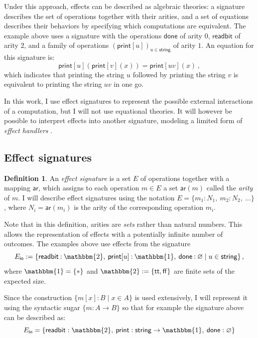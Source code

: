 \documentclass[11pt,oneside]{book}
\theoremstyle{definition}
\newtheorem{definition}[theorem]{Definition}
\newcommand{\kw}[1]{\ensuremath{ \mathsf{#1} }}
\begin{document}
Under this approach,
effects can be described as algebraic theories:
a signature describes the set of operations together with their arities,
and a set of equations describes their behaviors
by specifying which computations are equivalent.
The example above uses a signature with the operations
$\kw{done}$ of arity $0$,
$\kw{readbit}$ of arity $2$,
and a family of operations $(\kw{print}[u])_{u \in \kw{string}}$
of arity $1$.
An equation for this signature is:
\[
    \kw{print}[u](\kw{print}[v](x)) =
    \kw{print}[uv](x) \,,
\]
which indicates that
printing the string $u$ followed by
printing the string $v$ is equivalent to
printing the string $uv$ in one go.

In this work,
I use effect signatures to represent
the possible external interactions
of a computation,
but I will not use equational theories.
It will however be possible to interpret effects
into another signature,
modeling a limited form of
\emph{effect handlers} \citep{eff}.


\subsection{Effect signatures} %

\begin{definition} \label{def:esig}
An \emph{effect signature}
is a set $E$ of operations
together with a mapping $\kw{ar}$,
which assigns to each operation $m \in E$ a set $\kw{ar}(m)$
called the \emph{arity} of $m$.
I will describe effect signatures using the notation
$E = \{ m_1 \mathbin: N_1, \: m_2 \mathbin: N_2, \: \ldots \}$,
where $N_i = \kw{ar}(m_i)$ is the arity of the corresponding operation $m_i$.
\end{definition}

Note that in this definition,
arities are \emph{sets} rather than natural numbers.
This allows the representation of effects
with a potentially infinite number of outcomes.
The examples above
use effects from the signature
\[
  E_\kw{io} :=
  \{ \kw{readbit} \mathbin: \mathbbm{2}, \:
     \kw{print}[u] \mathbin: \mathbbm{1}, \:
     \kw{done} \mathbin: \varnothing \mid
     u \in \kw{string} \}
  \,,
\]
where $\mathbbm{1} = \{ * \}$ and $\mathbbm{2} := \{ \kw{tt}, \kw{ff} \}$
are finite sets of the expected size.

Since the construction
$\{ m[x] : B \mid x \in A \}$
is used extensively,
I will represent it using the syntactic sugar
$\{ m : A \rightarrow B \}$
so that for example the signature above can be described as:
\[
  E_\kw{io} =
  \{ \kw{readbit} : \mathbbm{2}, \:
     \kw{print} : \kw{string} \rightarrow \mathbbm{1}, \:
     \kw{done} : \varnothing \}
\]
\end{document}
